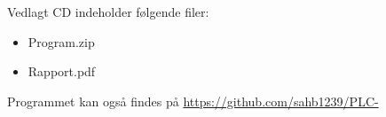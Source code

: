 Vedlagt CD indeholder følgende filer:

\begin{itemize}
    \item Program.zip
    \item Rapport.pdf
\end{itemize}

\noindent Programmet kan også findes på \url{https://github.com/sahb1239/PLC-}